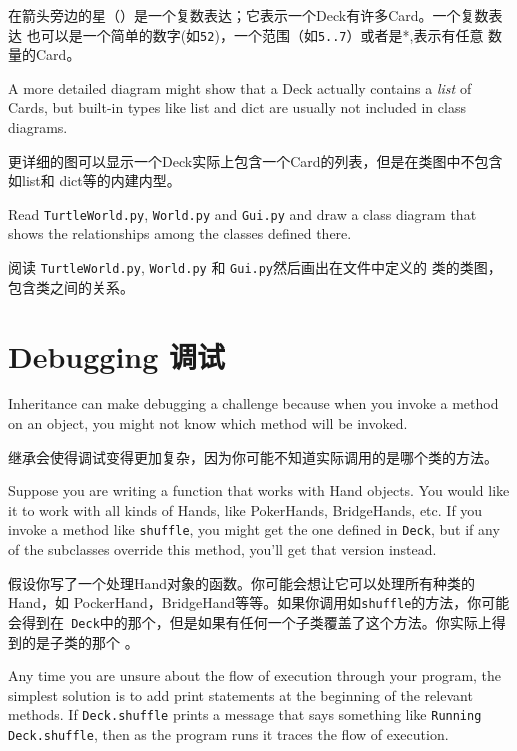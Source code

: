 \documentclass[10pt]{book}
\begin{document}
\begin{CJK}{UTF8}{gbsn}
在箭头旁边的星（{\tt *}）是一个复数表达；它表示一个Deck有许多Card。一个复数表达
也可以是一个简单的数字(如{\tt 52})，一个范围（如{\tt 5..7}）或者是*,表示有任意
数量的Card。

A more detailed diagram might show that a Deck actually
contains a {\em list} of Cards, but built-in types
like list and dict are usually not included in class diagrams.

更详细的图可以显示一个Deck实际上包含一个Card的列表，但是在类图中不包含如list和
dict等的内建内型。

\begin{exercise}

Read {\tt TurtleWorld.py}, {\tt World.py} and {\tt Gui.py}
and draw a class diagram that shows the relationships among
the classes defined there.

阅读 {\tt TurtleWorld.py}, {\tt World.py} 和 {\tt Gui.py}然后画出在文件中定义的
类的类图，包含类之间的关系。

\end{exercise}


\section{Debugging 调试}

Inheritance can make debugging a challenge because when you
invoke a method on an object, you might not know which method
will be invoked.

继承会使得调试变得更加复杂，因为你可能不知道实际调用的是哪个类的方法。

Suppose you are writing a function that works with Hand objects.
You would like it to work with all kinds of Hands, like
PokerHands, BridgeHands, etc.  If you invoke a method like
{\tt shuffle}, you might get the one defined in {\tt Deck},
but if any of the subclasses override this method, you'll
get that version instead.  

假设你写了一个处理Hand对象的函数。你可能会想让它可以处理所有种类的Hand，如
PockerHand，BridgeHand等等。如果你调用如{\tt shuffle}的方法，你可能会得到在{\tt
Deck}中的那个，但是如果有任何一个子类覆盖了这个方法。你实际上得到的是子类的那个
。

Any time you are unsure about the flow of execution through your
program, the simplest solution is to add print statements at the
beginning of the relevant methods.  If {\tt Deck.shuffle} prints a
message that says something like {\tt Running Deck.shuffle}, then as
the program runs it traces the flow of execution.


\end{CJK}
\end{document}
